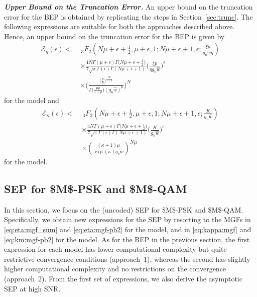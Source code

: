 \documentclass[journal,twocolumn]{IEEEtran}
\begin{document}
\textit{\textbf{Upper Bound on the Truncation Error.}} An upper bound on the truncation error for the \ac{BEP} is obtained by replicating the steps in Section~\ref{sec:trunc}. The following expressions are suitable for both the approaches described above. Hence, an upper bound on the truncation error for the \ac{BEP} is given by 
\begin{align}
    \mathcal{E}_{\eta}(\epsilon) < \ & \, _3F_2\left(N \mu +\epsilon+\frac{1}{2},\mu +\epsilon,1;N \mu +\epsilon+1,\epsilon; \frac{ \xi  p}{g_{\textrm{b}}\hat{w} \eta  }\right) \nonumber \\
    & \times  \frac{4 N\Gamma (\mu +\epsilon) \Gamma \big(N \mu +\epsilon+\frac{1}{2}\big)}{7\sqrt{\pi}\Gamma \left(\epsilon\right) \Gamma(N \mu +\epsilon+1)} \bigg(\frac{ \xi  p}{ \eta g_{\textrm{b}}\hat{w}   }\bigg)^{\epsilon} \nonumber \\
    & \times \Bigg(\frac{\big(\frac{p}{\eta }\big)^{\frac{\mu  p}{1+p}}}{\Gamma\big(\frac{\mu p}{1+p}\big) \left(g_{\textrm{b}}\hat{w} \right)^{\mu}}\Bigg)^N \label{eq:eta:bep-trunc}
\end{align}
for the \Ehm{} model and 
\begin{align}
   \mathcal{E}_{\kappa} (\epsilon) < \ & \, _3F_2\left(N \mu+\epsilon+\frac{1}{2},\mu +\epsilon,1;N \mu+\epsilon+1,\epsilon;\frac{K}{g_{\textrm{b}} \hat{w} }\right) \nonumber \\
    & \times \frac{4 N\Gamma \left(\mu +\epsilon\right) \Gamma \big(N \mu +\epsilon+\frac{1}{2}\big)}{7 \sqrt{\pi} \Gamma \left(\epsilon\right) \Gamma \left(N \mu +\epsilon+1\right)} \bigg(\frac{K}{g_{\textrm{b}} \hat{w}}\bigg)^{\epsilon} \nonumber \\
    &\times \left(\frac{(\kappa +1) \mu }{\exp (\kappa ) g_{\textrm{b}} \hat{w}}\right)^{N \mu} \label{eq:kappa:bep-trunc}
\end{align}
for the \km{} model.


\subsection{\ac{SEP} for \ac{$M$-PSK} and \ac{$M$-QAM}}

In this section, we focus on the (uncoded) \ac{SEP} for \ac{$M$-PSK} and \ac{$M$-QAM}. Specifically, we obtain new expressions for the \ac{SEP} by resorting to the \acp{MGF} in \eqref{eq:eta:mgf_sum} and \eqref{eq:eta:mgf-pb2} for the \Ehm{} model, and in \eqref{eq:kappa:mgf} and \eqref{eq:km:mgf-pb2} for the \km{} model. As for the \ac{BEP} in the previous section, the first expression for each model has lower computational complexity but quite restrictive convergence conditions (approach~1), whereas the second has slightly higher computational complexity and no restrictions on the convergence (approach~2). From the first set of expressions, we also derive the asymptotic \ac{SEP} at high \ac{SNR}.
\end{document}
